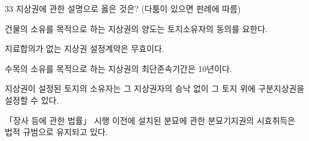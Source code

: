 \begin{question}{33}
지상권에 관한 설명으로 옳은 것은? (다툼이 있으면 판례에 따름)
\begin{choices}
  \item 건물의 소유를 목적으로 하는 지상권의 양도는 토지소유자의 동의를 요한다.
  \item 지료합의가 없는 지상권 설정계약은 무효이다.
  \item 수목의 소유를 목적으로 하는 지상권의 최단존속기간은 10년이다.
  \item 지상권이 설정된 토지의 소유자는 그 지상권자의 승낙 없이 그 토지 위에 구분지상권을 설정할 수 있다.
  \item 「장사 등에 관한 법률」 시행 이전에 설치된 분묘에 관한 분묘기지권의 시효취득은 법적 규범으로 유지되고 있다.
\end{choices}
\end{question}
